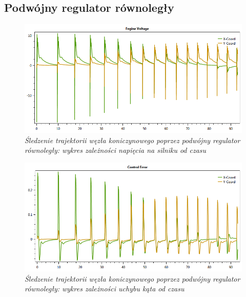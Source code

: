 \documentclass[12pt, oneside]{report}
\theoremstyle{definition}
\begin{document}
\begin{appendices}
\section{Podwójny regulator równoległy}
\begin{figure}[H]
	\centering
		\includegraphics[width = 400pt]{TrefoilKnotParallelEV} 
		\caption{\textit{Śledzenie trajektorii węzła koniczynowego poprzez podwójny regulator równoległy: wykres zależności napięcia na silniku od czasu}}
		\label{plot:TrefoilKnotParallelEV}
\end{figure}

\begin{figure}[H]
	\centering
		\includegraphics[width = 400pt]{TrefoilKnotParallelCE} 
		\caption{\textit{Śledzenie trajektorii węzła koniczynowego poprzez podwójny regulator równoległy: wykres zależności uchybu kąta od czasu}}
		\label{plot:TrefoilKnotParallelCE}
\end{figure}


\end{appendices}
\end{document}
